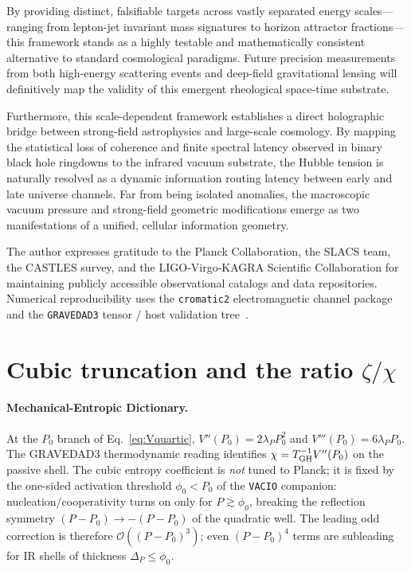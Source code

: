 \documentclass[prd,
               reprint,
               aps,
               preprintnumbers,
               nofootinbib,
               longbibliography,
               floatfix]{revtex4-2}
\begin{document}
By providing distinct, falsifiable targets across vastly separated energy
scales—ranging from lepton-jet invariant mass signatures to horizon
attractor fractions—this framework stands as a highly testable and
mathematically consistent alternative to standard cosmological paradigms.
Future precision measurements from both high-energy scattering events and
deep-field gravitational lensing will definitively map the validity of
this emergent rheological space-time substrate.

Furthermore, this scale-dependent framework establishes a direct 
holographic bridge between strong-field astrophysics and large-scale 
cosmology. By mapping the statistical loss of coherence and finite 
spectral latency observed in binary black hole ringdowns to the 
infrared vacuum substrate, the Hubble tension is naturally resolved 
as a dynamic information routing latency between early and late 
universe channels. Far from being isolated anomalies, the macroscopic 
vacuum pressure and strong-field geometric modifications emerge as 
two manifestations of a unified, cellular information geometry.



\begin{acknowledgments}
The author expresses gratitude to the Planck Collaboration, the 
SLACS team, the CASTLES survey, and the LIGO-Virgo-KAGRA Scientific 
Collaboration for maintaining publicly accessible observational 
catalogs and data repositories. Numerical reproducibility uses the
\texttt{cromatic2} electromagnetic channel package
~\cite{cromatic2zenodo} and the \texttt{GRAVEDAD3} tensor / host
validation tree~\cite{gravedad3zenodo}.
\end{acknowledgments}


\appendix
\section{Cubic truncation and the ratio \texorpdfstring{$\zeta/\chi$}{zeta/chi}}
\label{app:cubic_truncation}

\paragraph{Mechanical-Entropic Dictionary.}
At the $P_0$ branch of Eq.~\eqref{eq:Vquartic},
$V''(P_0)=2\lambda_P P_0^2$ and $V'''(P_0)=6\lambda_P P_0$.
The GRAVEDAD3 thermodynamic reading identifies
$\chi=T_{\rm GH}^{-1}V''(P_0)$ on the passive shell.
The cubic entropy coefficient is \emph{not} tuned to Planck; it is fixed
by the one-sided activation threshold $\phi_0<P_0$ of the \texttt{VACIO}
companion: nucleation/cooperativity turns on only for
$P\gtrsim\phi_0$, breaking the reflection symmetry
$(P-P_0)\to-(P-P_0)$ of the quadratic well.
The leading odd correction is therefore $\mathcal{O}((P-P_0)^3)$; even
$(P-P_0)^4$ terms are subleading for IR shells of thickness
$\Delta_P\le\phi_0$.
\end{document}
